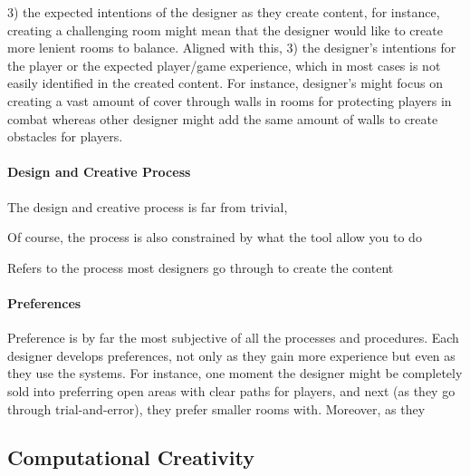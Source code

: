3) the expected intentions of the designer as they create content, for instance, creating a challenging room might mean that the designer would like to create more lenient rooms to balance. Aligned with this, 3) the designer's intentions for the player or the expected player/game experience, which in most cases is not easily identified in the created content. For instance, designer's might focus on creating a vast amount of cover through walls in rooms for protecting players in combat whereas other designer might add the same amount of walls to create obstacles for players. 

\paragraph{Design and Creative Process}

The design and creative process is far from trivial, 

Of course, the process is also constrained by what the tool allow you to do

Refers to the process most designers go through to create the content

\paragraph{Preferences}

Preference is by far the most subjective of all the processes and procedures. Each designer develops preferences, not only as they gain more experience but even as they use the systems. For instance, one moment the designer might be completely sold into preferring open areas with clear paths for players, and next (as they go through trial-and-error), they prefer smaller rooms with. Moreover, as they 

\subsection{Computational Creativity}



